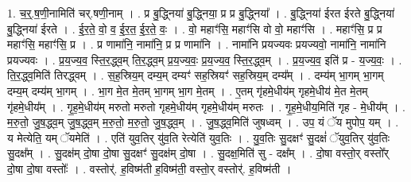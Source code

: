 \documentclass[17pt]{extarticle}
\begin{document}
1. च॒र्॒.ष॒णी॒नामिति॑ चर्.षणी॒नाम् । . प्र बु॒द्ध्निया॑ बु॒द्ध्निया॒ प्र प्र बु॒द्ध्निया᳚ । . बु॒द्ध्निया॑ ईरत ईरते बु॒द्ध्निया॑ बु॒द्ध्निया॑ ईरते । . ई॒र॒ते॒ वो॒ व॒ ई॒र॒त॒ ई॒र॒ते॒ वः॒ । . वो॒ महाꣳ॑सि॒ महाꣳ॑सि वो वो॒ महाꣳ॑सि । . महाꣳ॑सि॒ प्र प्र महाꣳ॑सि॒ महाꣳ॑सि॒ प्र । . प्र णामा॑नि॒ नामा॑नि॒ प्र प्र णामा॑नि । . नामा॑नि प्रयज्यवः प्रयज्यवो॒ नामा॑नि॒ नामा॑नि प्रयज्यवः । . प्र॒य॒ज्य॒व॒ स्ति॒र॒द्ध्व॒म् ति॒र॒द्ध्व॒म् प्र॒य॒ज्य॒वः॒ प्र॒य॒ज्य॒व॒ स्ति॒र॒द्ध्व॒म् । . प्र॒य॒ज्य॒व॒ इति॑ प्र - य॒ज्य॒वः॒ । . ति॒र॒द्ध्व॒मिति॑ तिरद्ध्वम् । . स॒ह॒स्रिय॒म् दम्य॒म् दम्यꣳ॑ सह॒स्रियꣳ॑ सह॒स्रिय॒म् दम्य᳚म् । . दम्य॑म् भा॒गम् भा॒गम् दम्य॒म् दम्य॑म् भा॒गम् । . भा॒ग मे॒त मे॒तम् भा॒गम् भा॒ग मे॒तम् । . ए॒तम् गृ॑हमे॒धीय॑म् गृहमे॒धीय॑ मे॒त मे॒तम् गृ॑हमे॒धीय᳚म् । . गृ॒ह॒मे॒धीय॑म् मरुतो मरुतो गृहमे॒धीय॑म् गृहमे॒धीय॑म् मरुतः । . गृ॒ह॒मे॒धीय॒मिति॑ गृह - मे॒धीय᳚म् । . म॒रु॒तो॒ जु॒ष॒द्ध्व॒म् जु॒ष॒द्ध्व॒म् म॒रु॒तो॒ म॒रु॒तो॒ जु॒ष॒द्ध्व॒म् । . जु॒ष॒द्ध्व॒मिति॑ जुषध्वम् । . उप॒ यं ॅय मुपोप॒ यम् । . य मेत्येति॒ यम् ॅयमेति॑ । . एति॑ युव॒तिर् यु॑व॒ति रेत्येति॑ युव॒तिः । . यु॒व॒तिः सु॒दक्षꣳ॑ सु॒दक्षं॑ ॅयुव॒तिर् यु॑व॒तिः सु॒दक्ष᳚म् । . सु॒दक्ष॑म् दो॒षा दो॒षा सु॒दक्षꣳ॑ सु॒दक्ष॑म् दो॒षा । . सु॒दक्ष॒मिति॑ सु - दक्ष᳚म् । . दो॒षा वस्तो॒र् वस्तो᳚र् दो॒षा दो॒षा वस्तोः᳚ । . वस्तोर्॑. ह॒विष्म॑ती ह॒विष्म॑ती॒ वस्तो॒र् वस्तोर्॑. ह॒विष्म॑ती । \newline
\end{document}
